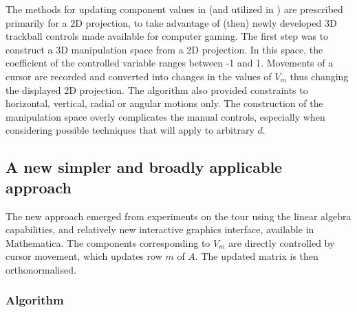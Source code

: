 \documentclass[]{interact}
\theoremstyle{plain}%
\theoremstyle{definition}
\theoremstyle{remark}
\begin{document}
The methods for updating component values in \citet{cook_manual_1997}
(and utilized in \citet{spyrison_spinifex_2020}) are prescribed
primarily for a 2D projection, to take advantage of (then) newly
developed 3D trackball controls made available for computer gaming. The
first step was to construct a 3D manipulation space from a 2D
projection. In this space, the coefficient of the controlled variable
ranges between -1 and 1. Movements of a cursor are recorded and
converted into changes in the values of \(V_m\) thus changing the
displayed 2D projection. The algorithm also provided constraints to
horizontal, vertical, radial or angular motions only. The construction
of the manipulation space overly complicates the manual controls,
especially when considering possible techniques that will apply to
arbitrary \(d\).

\hypertarget{a-new-simpler-and-broadly-applicable-approach}{%
\subsection{A new simpler and broadly applicable
approach}\label{a-new-simpler-and-broadly-applicable-approach}}

The new approach emerged from experiments on the tour using the linear
algebra capabilities, and relatively new interactive graphics interface,
available in Mathematica. The components corresponding to \(V_m\) are
directly controlled by cursor movement, which updates row \(m\) of
\(A\). The updated matrix is then orthonormalised.

\hypertarget{algorithm}{%
\subsubsection{Algorithm}\label{algorithm}}
\end{document}
